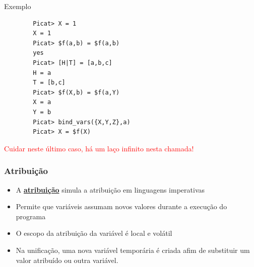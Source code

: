 
\begin{frame}[fragile]
	
	\begin{exampleblock}{Exemplo}
		
		\begin{verbatim}
		Picat> X = 1
		X = 1
		Picat> $f(a,b) = $f(a,b)
		yes
		Picat> [H|T] = [a,b,c]
		H = a
		T = [b,c]
		Picat> $f(X,b) = $f(a,Y)
		X = a
		Y = b
		Picat> bind_vars({X,Y,Z},a)
		Picat> X = $f(X)
		\end{verbatim}
	
	\textcolor{red}{Cuidar neste último caso, há um laço infinito nesta chamada!}	
		
	\end{exampleblock}
	
\end{frame}

\begin{frame}[fragile]
	\frametitle{Atribuição}
	
	\begin{itemize}
		
		\item A \textbf{\underline{atribuição}}  simula a atribuição em
		linguagens imperativas
		
		\pause
		\item Permite que variáveis assumam novos valores durante a execução
		do programa
		
				\pause
		\item O escopo da atribuição da variável é local e volátil
		
				\pause
		\item Na unificação,  uma nova variável temporária é criada 
		afim de substituir um valor	atribuído ou outra variável.
		
		
	\end{itemize}
	
\end{frame}


